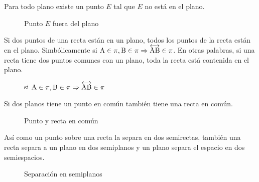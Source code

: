 \begin{postulate}
    Para todo plano existe un punto $E$ tal que $E$ no está en el plano.
    
    \begin{figure}[!h]
        \centering
        
        \caption{Punto $E$ fuera del plano}
        \label{fig:plot7}
    \end{figure}
\end{postulate}

\clearpage

\begin{postulate}
    Si dos puntos de una recta están en un plano, todos los puntos de la recta están en el plano. Simbólicamente si $\rm A \in \pi, \rm B \in \pi \Rightarrow \overleftrightarrow{\rm AB} \in \pi$. En otras palabras, si una recta tiene dos puntos comunes con un plano, toda la recta está contenida en el plano.
    
    \begin{figure}[!h]
        \centering
        
        \caption{si $\rm A \in \pi, \rm B \in \pi \Rightarrow \overleftrightarrow{\rm AB} \in \pi$}
        \label{fig:plot8}
    \end{figure}
    
\end{postulate}

\begin{postulate}
    Si dos planos tiene un punto en común también tiene una recta en común.
    
    \begin{figure}[!h]
        \centering
        
        \caption{Punto y recta en común}
        \label{fig:plot9}
    \end{figure}
    
\end{postulate}

\begin{postulate}
    Así como un punto sobre una recta la separa en dos semirectas, también una recta separa a un plano en dos semiplanos y un plano separa el espacio en dos semiespacios.
    
    \begin{figure}[!h]
        \centering
        
        \caption{Separación en semiplanos}
        \label{fig:plot16}
    \end{figure}
\end{postulate}

